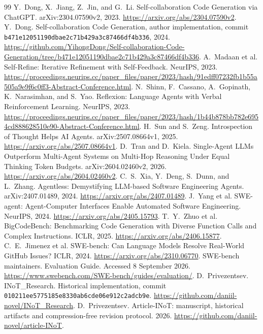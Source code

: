 \begin{thebibliography}{99}
 Y.~Dong, X.~Jiang, Z.~Jin, and G.~Li. Self-collaboration Code Generation via ChatGPT. arXiv:2304.07590v2, 2023. \url{https://arxiv.org/abs/2304.07590v2}.
 Y.~Dong. Self-collaboration Code Generation, author implementation, commit \texttt{b471e12051190dbae2c71b429a3c87466df4b336}, 2024. \url{https://github.com/YihongDong/Self-collaboration-Code-Generation/tree/b471e12051190dbae2c71b429a3c87466df4b336}.
 A.~Madaan et al. Self-Refine: Iterative Refinement with Self-Feedback. NeurIPS, 2023. \url{https://proceedings.neurips.cc/paper_files/paper/2023/hash/91edff07232fb1b55a505a9e9f6c0ff3-Abstract-Conference.html}.
 N.~Shinn, F.~Cassano, A.~Gopinath, K.~Narasimhan, and S.~Yao. Reflexion: Language Agents with Verbal Reinforcement Learning. NeurIPS, 2023. \url{https://proceedings.neurips.cc/paper_files/paper/2023/hash/1b44b878bb782e6954cd888628510e90-Abstract-Conference.html}.
 H.~Sun and S.~Zeng. Introspection of Thought Helps AI Agents. arXiv:2507.08664v1, 2025. \url{https://arxiv.org/abs/2507.08664v1}.
 D.~Tran and D.~Kiela. Single-Agent LLMs Outperform Multi-Agent Systems on Multi-Hop Reasoning Under Equal Thinking Token Budgets. arXiv:2604.02460v2, 2026. \url{https://arxiv.org/abs/2604.02460v2}.
 C.~S.~Xia, Y.~Deng, S.~Dunn, and L.~Zhang. Agentless: Demystifying LLM-based Software Engineering Agents. arXiv:2407.01489, 2024. \url{https://arxiv.org/abs/2407.01489}.
 J.~Yang et al. SWE-agent: Agent-Computer Interfaces Enable Automated Software Engineering. NeurIPS, 2024. \url{https://arxiv.org/abs/2405.15793}.
 T.~Y.~Zhuo et al. BigCodeBench: Benchmarking Code Generation with Diverse Function Calls and Complex Instructions. ICLR, 2025. \url{https://arxiv.org/abs/2406.15877}.
 C.~E.~Jimenez et al. SWE-bench: Can Language Models Resolve Real-World GitHub Issues? ICLR, 2024. \url{https://arxiv.org/abs/2310.06770}.
 SWE-bench maintainers. Evaluation Guide. Accessed 8 September 2026. \url{https://www.swebench.com/SWE-bench/guides/evaluation/}.
 D.~Privezentsev. INoT\_Research. Historical implementation, commit \texttt{010211ee5775185e8330ab6cde06e912c2adcb9e}. \url{https://github.com/daniil-novel/INoT_Research}.
 D.~Privezentsev. Article-INoT: manuscript, historical artifacts and compression-free revision protocol. 2026. \url{https://github.com/daniil-novel/article-INoT}.

\end{thebibliography}
